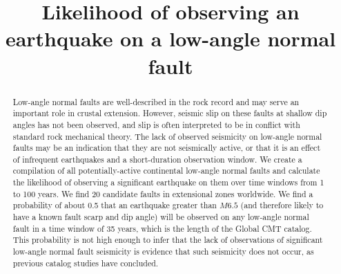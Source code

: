 \documentclass[draft,grl]{AGUTeX}
\begin{document}
\title{Likelihood of observing an earthquake on a low-angle normal fault}



\begin{abstract}
Low-angle normal faults are well-described in the rock record and may serve
an important role in crustal extension.  However, seismic slip on these
faults at shallow dip angles has not been observed, and slip is often 
interpreted to be in conflict with standard rock mechanical theory.
The lack of observed seismicity on low-angle normal faults may be an
indication that they are not seismically active, or that it is an effect of
infrequent earthquakes and a short-duration observation window.  
We create a compilation of all potentially-active continental low-angle normal
faults and calculate the likelihood of observing a significant earthquake on 
them over time windows from 1 to 100 years. We find 20 candidate faults in
extensional zones worldwide.  We find a probability of about 0.5 that an
earthquake greater than $M6.5$ (and therefore likely to have a known fault
scarp and dip angle) will be observed on any low-angle normal fault 
in a time window of 35 years, which is the length of the Global CMT catalog.
This probability is not high enough to infer that the
lack of observations of significant low-angle normal fault seismicity is
evidence that such seismicity does not occur, as previous catalog studies
have concluded.

\end{abstract}
\end{document}
